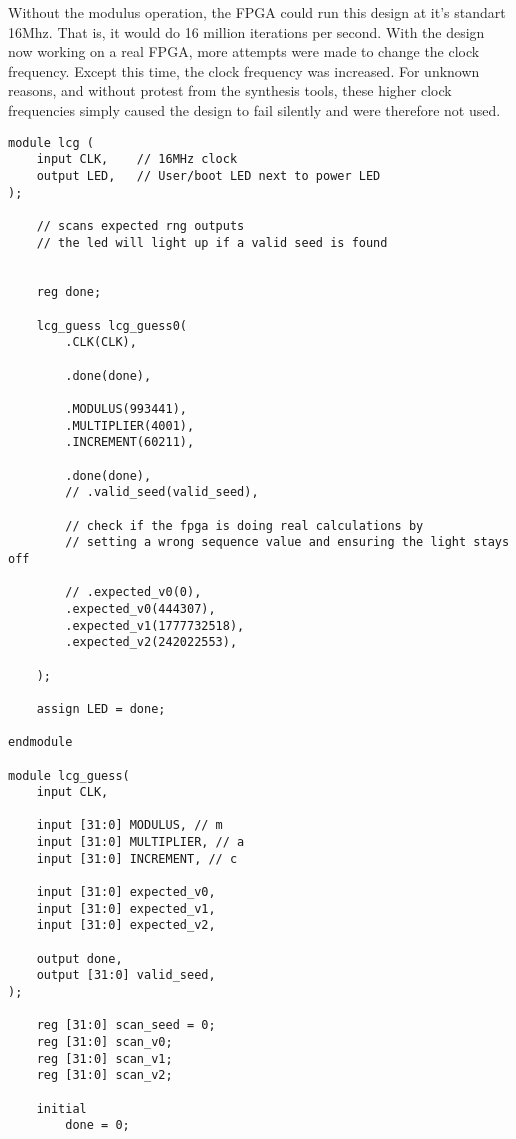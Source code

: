 \documentclass{article}
\begin{document}
    Without the modulus operation, the FPGA could run this design at it's
    standart 16Mhz. That is, it would do 16 million iterations per second.
    With the design now working on a real FPGA, more attempts were made
    to change the clock frequency. Except this time,
    the clock frequency was increased.
    For unknown reasons, and without protest from the synthesis tools,
    these higher clock frequencies simply caused the design to fail
    silently and were therefore not used.

    \lstset{language=Verilog}

    \begin{lstlisting}
module lcg (
    input CLK,    // 16MHz clock
    output LED,   // User/boot LED next to power LED
);

    // scans expected rng outputs
    // the led will light up if a valid seed is found
    
    
    reg done;

    lcg_guess lcg_guess0(
        .CLK(CLK),
        
        .done(done),
                
        .MODULUS(993441),
        .MULTIPLIER(4001),
        .INCREMENT(60211),
        
        .done(done),
        // .valid_seed(valid_seed),
        
        // check if the fpga is doing real calculations by 
        // setting a wrong sequence value and ensuring the light stays off
        
        // .expected_v0(0),
        .expected_v0(444307),
        .expected_v1(1777732518),
        .expected_v2(242022553),
        
    );
    
    assign LED = done;

endmodule

module lcg_guess(
    input CLK,
    
    input [31:0] MODULUS, // m
    input [31:0] MULTIPLIER, // a
    input [31:0] INCREMENT, // c
    
    input [31:0] expected_v0,
    input [31:0] expected_v1,
    input [31:0] expected_v2,
    
    output done,
    output [31:0] valid_seed,
);

    reg [31:0] scan_seed = 0;
    reg [31:0] scan_v0;
    reg [31:0] scan_v1;
    reg [31:0] scan_v2;
    
    initial 
        done = 0;
    

\end{lstlisting}
\end{document}
